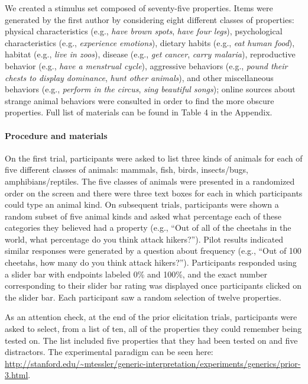 \documentclass[floatsintext,doc]{apa6}
\let\oldparagraph\paragraph
\renewcommand{\paragraph}[1]{\oldparagraph{#1}\mbox{}}
\begin{document}
We created a stimulus set composed of seventy-five properties.
Items were generated by the first author by considering eight different classes of properties: physical characteristics (e.g., \emph{have brown spots}, \emph{have four legs}), psychological characteristics (e.g., \emph{experience emotions}), dietary habits (e.g., \emph{eat human food}), habitat (e.g., \emph{live in zoos}), disease (e.g., \emph{get cancer}, \emph{carry malaria}), reproductive behavior (e.g., \emph{have a menstrual cycle}), aggressive behaviors (e.g., \emph{pound their chests to display dominance}, \emph{hunt other animals}), and other miscellaneous behaviors (e.g., \emph{perform in the circus}, \emph{sing beautiful songs}); online sources about strange animal behaviors were consulted in order to find the more obscure properties. Full list of materials can be found in Table 4 in the Appendix.

\hypertarget{procedure-and-materials-1}{%
\paragraph{Procedure and materials}\label{procedure-and-materials-1}}

On the first trial, participants were asked to list three kinds of animals for each of five different classes of animals: mammals, fish, birds, insects/bugs, amphibians/reptiles.
The five classes of animals were presented in a randomized order on the screen and there were three text boxes for each in which participants could type an animal kind.
On subsequent trials, participants were shown a random subset of five animal kinds and asked what percentage each of these categories they believed had a property (e.g., \enquote{Out of all of the cheetahs in the world, what percentage do you think attack hikers?}).
Pilot results indicated similar responses were generated by a question about frequency (e.g., \enquote{Out of 100 cheetahs, how many do you think attack hikers?}).
Participants responded using a slider bar with endpoints labeled 0\% and 100\%, and the exact number corresponding to their slider bar rating was displayed once participants clicked on the slider bar.
Each participant saw a random selection of twelve properties.

As an attention check, at the end of the prior elicitation trials, participants were asked to select, from a list of ten, all of the properties they could remember being tested on.
The list included five properties that they had been tested on and five distractors.
The experimental paradigm can be seen here: \url{http://stanford.edu/~mtessler/generic-interpretation/experiments/generics/prior-3.html}.
\end{document}
